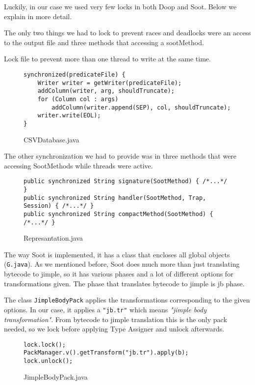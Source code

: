 \documentclass{dithesis}
\begin{document}
	Luckily, in our case we used very few locks in both Doop and Soot. Below we explain in more detail.

    	The only two things we had to lock to prevent races and deadlocks were an access to the output file and three methods that accessing a sootMethod.

	    	Lock file to prevent more than one thread to write at the same time.
	    	\begin{figure}[H]
\begin{lstlisting}
synchronized(predicateFile) {
    Writer writer = getWriter(predicateFile);
    addColumn(writer, arg, shouldTruncate);
    for (Column col : args)
        addColumn(writer.append(SEP), col, shouldTruncate);
    writer.write(EOL);
}
\end{lstlisting}
	        \caption{CSVDatabase.java}
	        \end{figure}

	    	The other synchronization we had to provide was in three methods that were accessing SootMethods while threads were active.
	    	\begin{figure}[H]
\begin{lstlisting}
public synchronized String signature(SootMethod) { /*...*/ }
public synchronized String handler(SootMethod, Trap, Session) { /*...*/ }
public synchronized String compactMethod(SootMethod) { /*...*/ }
\end{lstlisting}
	        \caption{Represantation.java}
	        \end{figure}


	    The way Soot is implemented, it has a class that encloses all global objects (\texttt{G.java}). As we mentioned before, Soot does much more than just translating bytecode to jimple, so it has various phases and a lot of different options for transformations given. The phase that translates bytecode to jimple is jb phase.

	    	The class \texttt{JimpleBodyPack} applies the transformations corresponding to the given options. In our case, it applies a \texttt{"jb.tr"} which means \textit{"jimple body transformation"}. From bytecode to jimple translation this is the only pack needed, so we lock before applying Type Assigner and unlock afterwards.
	    	\begin{figure}[H]
\begin{lstlisting}
lock.lock();
PackManager.v().getTransform("jb.tr").apply(b);
lock.unlock();
\end{lstlisting}
	        \caption{JimpleBodyPack.java}
	        \end{figure}
\end{document}
